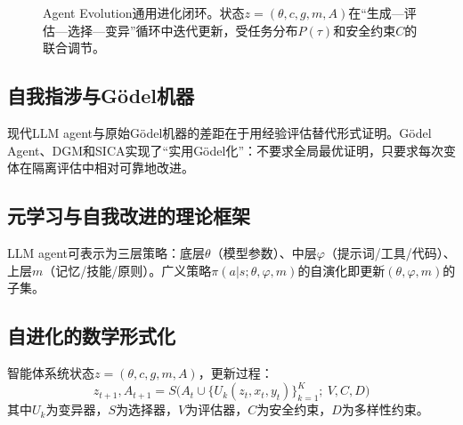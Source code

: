 \begin{figure}[htbp]
\caption{Agent Evolution通用进化闭环。状态$z=(\theta, c, g, m, A)$在``生成—评估—选择—变异''循环中迭代更新，受任务分布$P(\tau)$和安全约束$C$的联合调节。}
\label{fig:evolution-loop}
\end{figure}

\subsection{自我指涉与G\"{o}del机器}

现代LLM agent与原始G\"{o}del机器的差距在于用经验评估替代形式证明。G\"{o}del Agent、DGM和SICA实现了``实用G\"{o}del化''：不要求全局最优证明，只要求每次变体在隔离评估中相对可靠地改进。

\subsection{元学习与自我改进的理论框架}

LLM agent可表示为三层策略：底层$\theta$（模型参数）、中层$\varphi$（提示词/工具/代码）、上层$m$（记忆/技能/原则）。广义策略$\pi(a|s; \theta, \varphi, m)$的自演化即更新$(\theta, \varphi, m)$的子集。

\subsection{自进化的数学形式化}

智能体系统状态$z=(\theta, c, g, m, A)$，更新过程：
\begin{equation}
z_{t+1}, A_{t+1} = S\Big(A_t \cup \{U_k(z_t, x_t, y_t)\}_{k=1}^K;\ V, C, D\Big)
\end{equation}
其中$U_k$为变异器，$S$为选择器，$V$为评估器，$C$为安全约束，$D$为多样性约束。
